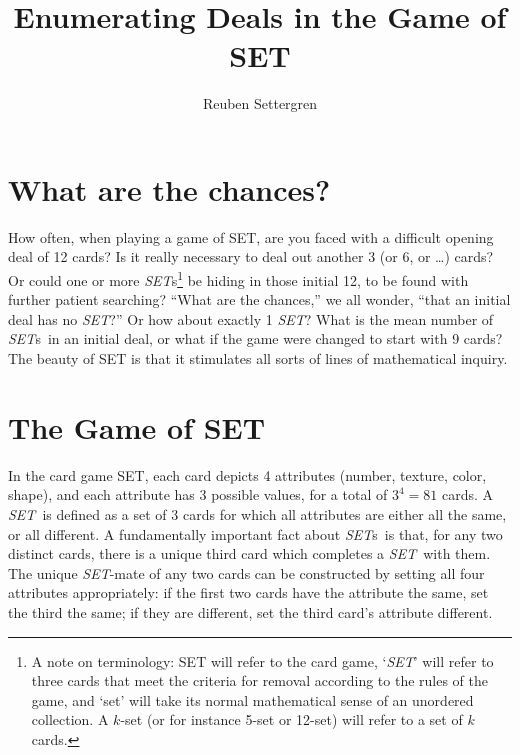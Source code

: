 \documentclass{article}
\newcommand{\SET}{{\em SET}}
\newcommand{\SETs}{{\em SET}s}
\begin{document}
\title{Enumerating Deals in the Game of SET}
\author{Reuben Settergren}



\maketitle

\section{What are the chances?}
How often, when playing a game of SET\texttrademark, are you faced with a
difficult opening deal of 12 cards? Is it really necessary to deal out another 3
(or 6, or \ldots) cards? Or could one or more \SETs\footnote{A note on
terminology: SET will refer to the card game, `\SET' will refer to three cards
that meet the criteria for removal according to the rules of the game, and `set'
will take its normal mathematical sense of an unordered collection. A $k$-set
(or for instance 5-set or 12-set) will refer to a set of $k$ cards.} be hiding
in those initial 12, to be found with further patient searching?  ``What are the
chances,'' we all wonder, ``that an initial deal has no \SET?'' Or how about
exactly 1 \SET? What is the mean number of \SETs~in an initial deal, or what if
the game were changed to start with 9 cards? The beauty of SET is that it
stimulates all sorts of lines of mathematical inquiry.


\section{The Game of SET}
In the card game SET, each card depicts 4 attributes (number, texture, color,
shape), and each attribute has 3 possible values, for a total of $3^4=81$
cards. A \SET~is defined as a set of 3 cards for which all attributes are
either all the same, or all different. A fundamentally important fact about
\SETs~is that, for any two distinct cards, there is a unique third card which
completes a \SET~with them. The unique \SET-mate of any two cards can be
constructed by setting all four attributes appropriately: if the first two cards
have the attribute the same, set the third the same; if they are different, set
the third card's attribute different.
\end{document}
